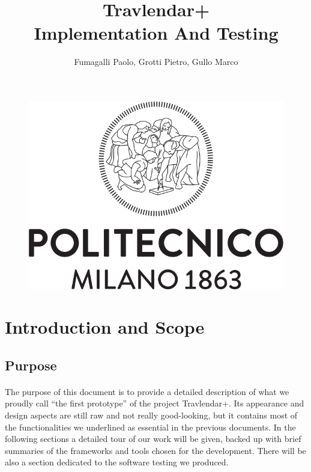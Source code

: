 \documentclass{article}
\title{Travlendar+\\Implementation And Testing}
\author{Fumagalli Paolo, Grotti Pietro, Gullo Marco}
\begin{document}
\begin{figure}[t]
\includegraphics[width=\linewidth]{Images/Logo_Politecnico_Milano.png}
\label{fig:Logo}
\end{figure}
\maketitle
\newpage
{}
\tableofcontents
\newpage
{}
	\section{Introduction and Scope}
		\subsection{Purpose}
			\paragraph{}The purpose of this document is to provide a detailed description of what we proudly call “the first prototype” of the project Travlendar+. Its appearance and design aspects are still raw and not really good-looking, but it contains most of the functionalities we underlined as essential in the previous documents. In the following sections a detailed tour of our work will be given, backed up with brief summaries of the frameworks and tools chosen for the development. There will be also a section dedicated to the software testing we produced.
\end{document}
